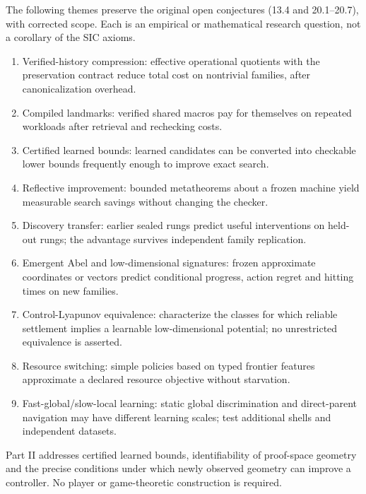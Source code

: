 \documentclass[11pt]{article}
\theoremstyle{definition}\newtheorem{definition}[theorem]{Definition}\newtheorem{example}[theorem]{Example}\newtheorem{conjecture}[theorem]{Conjecture}
\begin{document}
The following themes preserve the original open conjectures (13.4 and 20.1--20.7), with corrected scope. Each is an empirical or mathematical research question, not a corollary of the SIC axioms.
\begin{enumerate}[leftmargin=*]
\item Verified-history compression: effective operational quotients with the preservation contract reduce total cost on nontrivial families, after canonicalization overhead.
\item Compiled landmarks: verified shared macros pay for themselves on repeated workloads after retrieval and rechecking costs.
\item Certified learned bounds: learned candidates can be converted into checkable lower bounds frequently enough to improve exact search.
\item Reflective improvement: bounded metatheorems about a frozen machine yield measurable search savings without changing the checker.
\item Discovery transfer: earlier sealed rungs predict useful interventions on held-out rungs; the advantage survives independent family replication.
\item Emergent Abel and low-dimensional signatures: frozen approximate coordinates or vectors predict conditional progress, action regret and hitting times on new families.
\item Control-Lyapunov equivalence: characterize the classes for which reliable settlement implies a learnable low-dimensional potential; no unrestricted equivalence is asserted.
\item Resource switching: simple policies based on typed frontier features approximate a declared resource objective without starvation.
\item Fast-global/slow-local learning: static global discrimination and direct-parent navigation may have different learning scales; test additional shells and independent datasets.
\end{enumerate}
Part II addresses certified learned bounds, identifiability of proof-space geometry and the precise conditions under which newly observed geometry can improve a controller. No player or game-theoretic construction is required.
\end{document}
